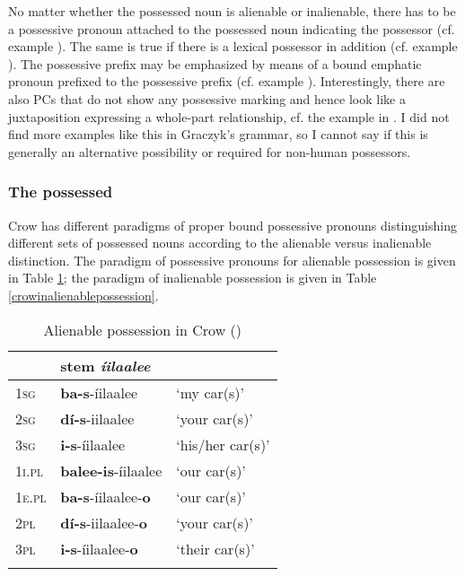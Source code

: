 \documentclass[output=paper]{LSP/langsci}
\begin{document}
No matter whether the possessed noun is alienable or inalienable, there has to be a possessive pronoun attached to the possessed noun indicating the possessor (cf. example ). The same is true if there is a lexical possessor in addition (cf. example ). The possessive prefix may be emphasized by means of a bound emphatic pronoun prefixed to the possessive prefix (cf. example ). Interestingly, there are also PCs that do not show any possessive marking and hence look like a juxtaposition expressing a whole-part relationship, cf. the example in . I did not find more examples like this in Graczyk's grammar, so I cannot say if this is generally an alternative possibility or required for non-human possessors.

\subsubsection{The possessed}
Crow has different paradigms of proper bound possessive pronouns distinguishing different sets of possessed nouns according to the alienable versus inalienable distinction. The paradigm of possessive pronouns for alienable possession is given in Table \ref{crowalienablepossession}; the paradigm of inalienable possession is given in Table \ref{crowinalienablepossession}.

\begin{table}
\caption{Alienable possession in Crow (\citealt[53]{Graczyk2007})} \label{crowalienablepossession}
\begin{tabular}{ l l l}
\lsptoprule
& stem \textit{íilaalee} & \\
\midrule 	
\textsc{1sg} & \textbf{ba-s}-íilaalee	& `my car(s)' \\
 
\textsc{2sg} & \textbf{dí-s}-iilaalee & `your car(s)' \\
 
\textsc{3sg} & \textbf{i-s}-íilaalee & `his/her car(s)' \\
 
\textsc{1i.pl} & \textbf{balee-is}-íilaalee & `our car(s)' \\
 
\textsc{1e.pl} & \textbf{ba-s}-íilaalee-\textbf{o} & `our car(s)' \\
 
\textsc{2pl} & \textbf{dí-s}-iilaalee-\textbf{o} & `your car(s)' \\
 
\textsc{3pl} & \textbf{i-s}-íilaalee-\textbf{o} & `their car(s)' \\
\lspbottomrule
\end{tabular}
\end{table}
\end{document}
